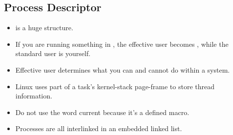 \documentclass[]{article}
\begin{document}
\subsection{Process Descriptor}
\begin{itemize}
\item {} is a huge structure.
\item If you are running something in , the effective user becomes
, while the standard user is yourself.
\item Effective user determines what you can and cannot do within a system.
\item Linux uses part of a task's kernel-stack page-frame to store thread 
information.
\item Do not use the word current because it's a defined macro.
\item Processes are all interlinked in an embedded linked list.
\end{itemize}
\end{document}
